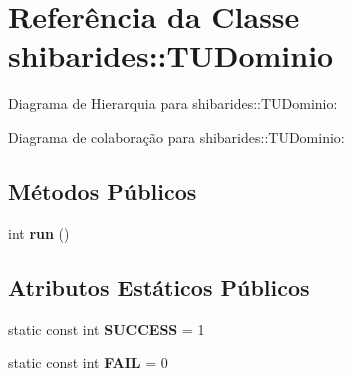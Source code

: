 \hypertarget{classshibarides_1_1TUDominio}{}\section{Referência da Classe shibarides\+:\+:T\+U\+Dominio}
\label{classshibarides_1_1TUDominio}


Diagrama de Hierarquia para shibarides\+:\+:T\+U\+Dominio\+:


Diagrama de colaboração para shibarides\+:\+:T\+U\+Dominio\+:
\subsection*{Métodos Públicos}
\begin{DoxyCompactItemize}
\item 
int {\bfseries run} ()\hypertarget{classshibarides_1_1TUDominio_a3ed6438c91e763541b289e352d9d0d9d}{}\label{classshibarides_1_1TUDominio_a3ed6438c91e763541b289e352d9d0d9d}

\end{DoxyCompactItemize}
\subsection*{Atributos Estáticos Públicos}
\begin{DoxyCompactItemize}
\item 
static const int {\bfseries S\+U\+C\+C\+E\+SS} = 1\hypertarget{classshibarides_1_1TUDominio_aaed9469af819def9a9f2117e6c72d8b4}{}\label{classshibarides_1_1TUDominio_aaed9469af819def9a9f2117e6c72d8b4}

\item 
static const int {\bfseries F\+A\+IL} = 0\hypertarget{classshibarides_1_1TUDominio_a93c02894a2f820b9d2cefe501a2f06f5}{}\label{classshibarides_1_1TUDominio_a93c02894a2f820b9d2cefe501a2f06f5}

\end{DoxyCompactItemize}
